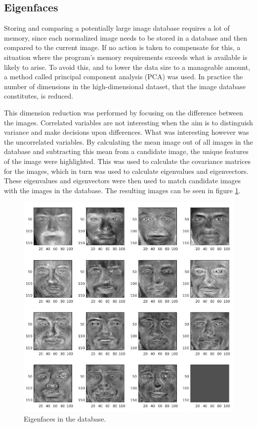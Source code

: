 \subsection{Eigenfaces}
Storing and comparing a potentially large image database requires a lot of
memory, since each normalized image needs to be stored in a database and then
compared to the current image. If no action is taken to compensate for this, a
situation where the program’s memory requirements exceeds what is available is
likely to arise. To avoid this, and to lower the data size to a manageable
amount, a method called principal component analysis (PCA) was used. In
practice the number of dimensions in the high-dimensional dataset, that the
image database constitutes, is reduced.

This dimension reduction was performed by focusing on the difference between
the images. Correlated variables are not interesting when the aim is to
distinguish variance and make decisions upon differences. What was interesting
however was the uncorrelated variables. By calculating the mean image out of
all images in the database and subtracting this mean from a candidate image,
the unique features of the image were highlighted. This was used to calculate
the covariance matrices for the images, which in turn was used to calculate
eigenvalues and eigenvectors. These eigenvalues and eigenvectors were then
used to match candidate images with the images in the database. The resulting images can be seen in figure \ref{fig:eigen}.

\begin{figure}[htbp]
  \centering
  \includegraphics[width=\columnwidth]{images/eigen.jpg}
  \caption{Eigenfaces in the database.}
  \label{fig:eigen}
\end{figure}

